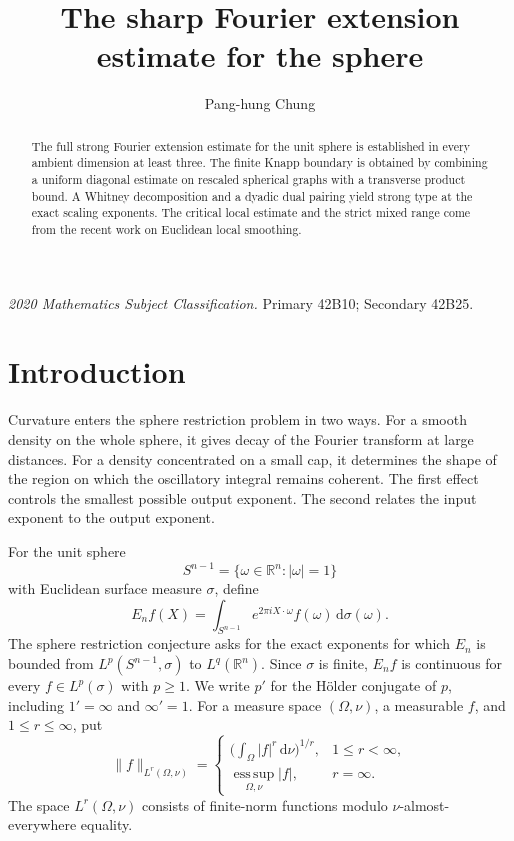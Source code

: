 \documentclass[11pt]{article}
\title{The sharp Fourier extension estimate for the sphere}
\author{Pang-hung Chung}
\date{}
\numberwithin{equation}{section}
\newcommand{\R}{\mathbb{R}}
\newcommand{\dd}{\,\mathrm{d}}
\newcommand{\norm}[1]{\lVert #1\rVert}
\begin{document}
\maketitle
\begin{abstract}
The full strong Fourier extension estimate for the unit sphere is established
in every ambient dimension at least three. The finite Knapp boundary is
obtained by combining a uniform diagonal estimate on rescaled spherical
graphs with a transverse product bound. A Whitney decomposition and a
dyadic dual pairing yield strong type at the exact scaling exponents.
The critical local estimate and the strict mixed range come from the
recent work on Euclidean local smoothing.
\end{abstract}
\noindent\textit{2020 Mathematics Subject Classification.}
Primary 42B10; Secondary 42B25.

\section{Introduction}
\label{sec:intro}

Curvature enters the sphere restriction problem in two ways. For a
smooth density on the whole sphere, it gives decay of the Fourier
transform at large distances. For a density concentrated on a small
cap, it determines the shape of the region on which the oscillatory
integral remains coherent. The first effect controls the smallest
possible output exponent. The second relates the input exponent to the
output exponent.

For the unit sphere
\[
 S^{n-1}=\{\omega\in\R^n:|\omega|=1\}
\]
with Euclidean surface measure \(\sigma\), define
\[
 E_n f(X)=\int_{S^{n-1}}e^{2\pi i X\cdot\omega} f(\omega)\dd\sigma(\omega).
\]
The sphere restriction conjecture asks for the exact exponents for which
$E_n$ is bounded from $L^p(S^{n-1},\sigma)$ to $L^q(\R^n)$.
Since $\sigma$ is finite, $E_n f$ is continuous for every
$f\in L^p(\sigma)$ with $p\geq1$. We write $p'$ for the H\"older conjugate
of $p$, including $1'=\infty$ and $\infty'=1$.
For a measure space \((\Omega,\nu)\), a measurable \(f\), and
\(1\le r\le\infty\), put
\[
 \norm f_{L^r(\Omega,\nu)}
 =\begin{cases}
   \bigl(\int_\Omega |f|^r\dd\nu\bigr)^{1/r},&1\le r<\infty,\\
   \operatorname*{ess\,sup}_{\Omega,\nu}|f|,&r=\infty.
  \end{cases}
\]
The space \(L^r(\Omega,\nu)\) consists of finite-norm functions modulo
\(\nu\)-almost-everywhere equality.
\end{document}
